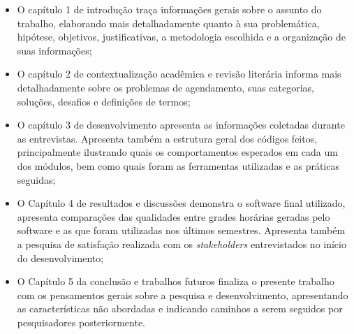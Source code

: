     \begin{itemize}
        \item O capítulo 1 de introdução traça informações gerais sobre o assunto do trabalho, elaborando mais detalhadamente quanto à sua problemática, hipótese, objetivos, justificativas, a metodologia escolhida e a organização de suas informações;
        \item O capítulo 2 de contextualização acadêmica e revisão literária informa mais detalhadamente sobre os problemas de agendamento, suas categorias, soluções, desafios e definições de termos;
        \item O capítulo 3 de desenvolvimento apresenta as informações coletadas durante as entrevistas. Apresenta também a estrutura geral dos códigos feitos, principalmente ilustrando quais os comportamentos esperados em cada um dos módulos, bem como quais foram as ferramentas utilizadas e as práticas seguidas;
        \item O Capítulo 4 de resultados e discussões demonstra o software final utilizado, apresenta comparações das qualidades entre grades horárias geradas pelo software e as que foram utilizadas nos últimos semestres. Apresenta também a pesquisa de satisfação realizada com os \textit{stakeholders} entrevistados no início do desenvolvimento;
        \item O Capítulo 5 da conclusão e trabalhos futuros finaliza o presente trabalho com os pensamentos gerais sobre a pesquisa e desenvolvimento, apresentando as características não abordadas e indicando caminhos a serem seguidos por pesquisadores posteriormente.
    \end{itemize}

